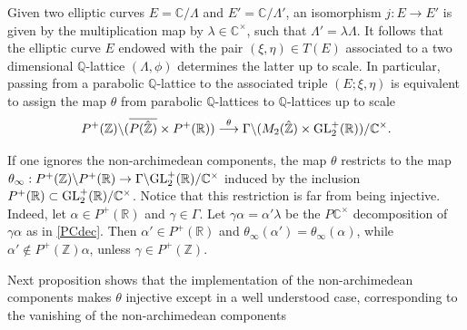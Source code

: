 \documentclass[graybox, envcountsect%
]{svmult}
\def\GL{{\rm GL}}
\def\C{{\mathbb C}}
\def\Q{{\mathbb Q}}
\def\R{{\mathbb R}}
\def\Z{{\mathbb Z}}
\begin{document}
Given two elliptic curves $E=\C/\Lambda$ and $E'=\C/\Lambda'$, an isomorphism $j:E\to E'$ is given by the multiplication map by  $\lambda\in \C^\times$, such that $\Lambda'=\lambda \Lambda$. It follows that the  elliptic curve $E$ endowed with  the pair $(\xi,\eta)\in T(E)$ associated to a two dimensional $\Q$-lattice $(\Lambda,\phi)$ determines the latter  up to scale. In particular, passing from a parabolic $\Q$-lattice to the associated triple  $(E;\xi,\eta)$   is equivalent to assign the map  $\theta$ from parabolic $\Q$-lattices to $\Q$-lattices up to scale
 	\begin{equation}\label{P2gl2scal}
P^+(\Z)\backslash (\overline{P(\hat \Z)}\times P^+(\R))\stackrel{\theta}{\longrightarrow} \Gamma\backslash
(M_2(\hat\Z)\times \GL_2^+(\R)) /\C^\times.
\end{equation}

\begin{rem}
	If one ignores the non-archimedean components,  the map $\theta$ restricts to the map  $\theta_\infty:P^+(\Z)\backslash P^+(\R)\to \Gamma\backslash\GL_2^+(\R) /\C^\times$ induced by the inclusion $P^+(\R)\subset \GL_2^+(\R) /\C^\times$. Notice that this restriction is far from being injective. Indeed, let $\alpha\in P^+(\R)$ and $\gamma\in \Gamma$. Let  $\gamma\alpha=\alpha'\lambda$ be the $P\C^\times$ decomposition  of $\gamma\alpha$ as in \eqref{PCdec}. Then $\alpha'\in P^+(\R)$ and  $\theta_\infty(\alpha')=\theta_\infty(\alpha)$, while  $\alpha'\notin P^+(\Z)\alpha$, unless $\gamma\in P^+(\Z)$.
\end{rem}

Next proposition shows that the implementation of the non-archimedean components makes $\theta$ injective except in a well understood case, corresponding to the vanishing of the non-archimedean components
\end{document}
